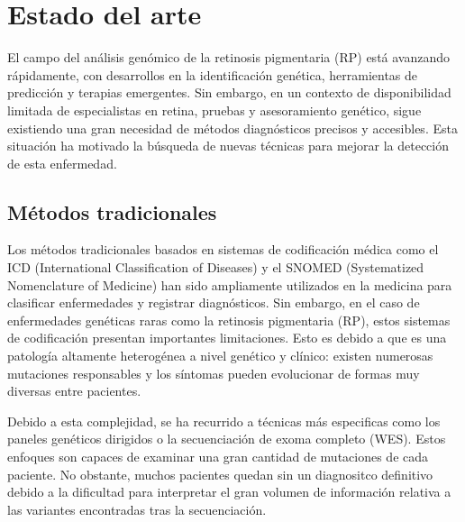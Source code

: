 \documentclass[11pt,spanish,listoffigures,listoftables]{tfgetsinf}
\begin{document}



\chapter{Estado del arte}

El campo del análisis genómico de la retinosis pigmentaria (RP) está avanzando rápidamente, con desarrollos en la identificación genética, herramientas de predicción y terapias emergentes. Sin embargo, en un contexto de disponibilidad limitada de especialistas en retina, pruebas y asesoramiento genético, sigue existiendo una gran necesidad de métodos diagnósticos precisos y accesibles. Esta situación ha motivado la búsqueda de nuevas técnicas para mejorar la detección de esta enfermedad.

\section{Métodos tradicionales}

Los métodos tradicionales basados en sistemas de codificación médica como el ICD (International Classification of Diseases) y el SNOMED (Systematized Nomenclature of Medicine) han sido ampliamente utilizados en la medicina para clasificar enfermedades y registrar diagnósticos. Sin embargo, en el caso de enfermedades genéticas raras como la retinosis pigmentaria (RP), estos sistemas de codificación presentan importantes limitaciones\cite{VER}. Esto es debido a que es una patología altamente heterogénea a nivel genético y clínico: existen numerosas mutaciones responsables y los síntomas pueden evolucionar de formas muy diversas entre pacientes\cite{HAR}. 

Debido a esta complejidad, se ha recurrido a técnicas más especificas como los paneles genéticos dirigidos o la secuenciación de exoma completo (WES). Estos enfoques son capaces de examinar una gran cantidad de mutaciones de cada paciente. No obstante, muchos pacientes quedan sin un diagnositco definitivo debido a la dificultad para interpretar el gran volumen de información relativa a las variantes encontradas tras la secuenciación.
\end{document}
